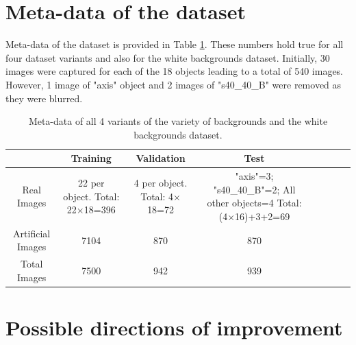 \section{Meta-data of the dataset}

Meta-data of the dataset is provided in Table \ref{Table:meta}. These numbers hold true for all four dataset variants and also for the white backgrounds dataset. Initially, 30 images were captured for each of the 18 objects leading to a total of 540 images. However, 1 image of "axis" object and 2 images of "s40\_40\_B" were removed as they were blurred.

\begin{table}
	\centering
	\begin{tabular}{|c|c|c|c|c|c|c|c|}
	\hline 
    & Training & Validation & Test \\ 
	\hline 
	Real Images & \makecell{22 per object.\\ Total: 22$\times$18=396} & \makecell{4 per object.\\ Total: 4$\times$18=72} & 				\makecell{"axis"=3; \\"s40\_40\_B"=2; \\All other objects=4\\ Total: (4$\times$16)+3+2=69} \\ 
	\hline 
	Artificial Images & 7104 & 870 & 870 \\ 
	\hline 
	Total Images & 7500 & 942 & 939 \\ 
	\hline 
	\end{tabular}
	\caption{Meta-data of all 4 variants of the variety of backgrounds and the white backgrounds dataset.}
	\label{Table:meta}
\end{table}

\section{Possible directions of improvement}

